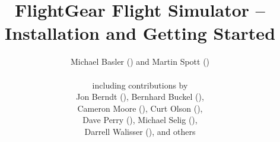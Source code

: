 
\title{FlightGear Flight Simulator -- Installation and Getting Started}

\author{
 Michael Basler () and Martin Spott ()\\\\ 
  including contributions by\\
  Jon Berndt (),
  Bernhard Buckel (),\\
  Cameron Moore (),
  Curt Olson (),\\
  Dave Perry (),
  Michael Selig (),\\
  Darrell Walisser (),  
  and others\\
{ \setlength{\fboxsep}{12mm}\setlength{\fboxrule}{0pt}
 \centerline{}}}

